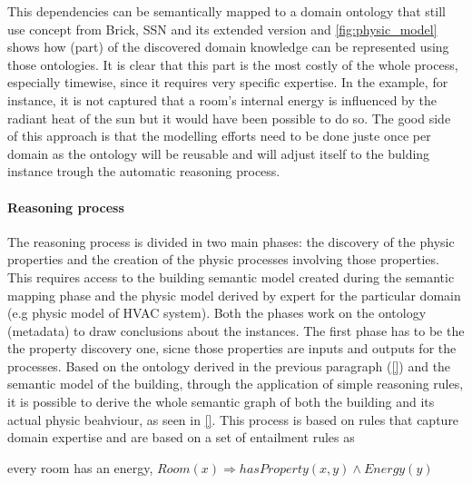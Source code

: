 This dependencies can be semantically mapped to a domain ontology that still use concept from Brick, SSN and its extended version and \autoref{fig:physic_model} shows how (part) of the discovered domain knowledge can be represented using those ontologies.
It is clear that this part is the most costly of the whole process, especially timewise, since it requires very specific expertise. In the example, for instance, it is not captured that a room's internal energy is influenced by the radiant heat of the sun but it would have been possible to do so. The good side of this approach is that the modelling efforts need to be done juste once per domain as the ontology will be reusable and will adjust itself to the bulding instance trough the automatic reasoning process.

\paragraph{Reasoning process}
The reasoning process is divided in two main phases: the discovery of the physic properties and the creation of the physic processes involving those properties. This requires access to the building semantic model created during the semantic mapping phase and the physic model derived by expert for the particular domain (e.g physic model of HVAC system). Both the phases work on the ontology (metadata) to draw conclusions about the instances. The first phase has to be the the property discovery one, sicne those properties are inputs and outputs for the processes. Based on the ontology derived in the previous paragraph (\autoref{}) and the semantic model of the building, through the application of simple reasoning rules, it is possible to derive the whole semantic graph of both the building and its actual physic beahviour, as seen in \autoref{}. This process is based on rules that capture domain expertise and are based on a set of entailment rules as
\begin{description}[noitemsep]
  \item every room has an energy, $Room(x) \Rightarrow hasProperty(x, y)\wedge Energy(y)$
\end{description}
